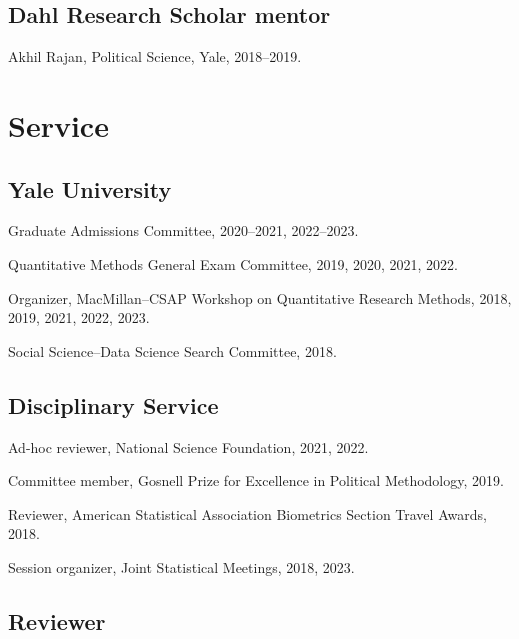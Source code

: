 \documentclass[10pt,letterpaper]{article}
\newenvironment{infolist}{
	\begin{list}{}{
		\setlength{\parskip}{0pt}
		\setlength{\itemsep}{4pt}
		\setlength{\parsep}{0.3em}
		\setlength{\leftmargin}{0em}
		\setlength{\labelwidth}{0em}
		}
	}{
\end{list}
}
\newcommand{\infoitem}[1]{\item {#1}}
\begin{document}
	\subsection*{Dahl Research Scholar mentor}

	\begin{infolist}
		\infoitem{Akhil Rajan, Political Science, Yale, 2018--2019.}
	\end{infolist}


	\section*{Service}

	\subsection*{Yale University}

	\begin{infolist}
		\infoitem{Graduate Admissions Committee, 2020--2021, 2022--2023.}
		\infoitem{Quantitative Methods General Exam Committee, 2019, 2020, 2021, 2022.}
		\infoitem{Organizer, MacMillan--CSAP Workshop on Quantitative Research Methods, 2018, 2019, 2021, 2022, 2023.}
		\infoitem{Social Science--Data Science Search Committee, 2018.}
	\end{infolist}

	\subsection*{Disciplinary Service}

	\begin{infolist}
		\infoitem{Ad-hoc reviewer, National Science Foundation, 2021, 2022.}
		\infoitem{Committee member, Gosnell Prize for Excellence in Political Methodology, 2019.}
		\infoitem{Reviewer, American Statistical Association Biometrics Section Travel Awards, 2018.}
		\infoitem{Session organizer, Joint Statistical Meetings, 2018, 2023.}
	\end{infolist}

	\subsection*{Reviewer}
\end{document}
